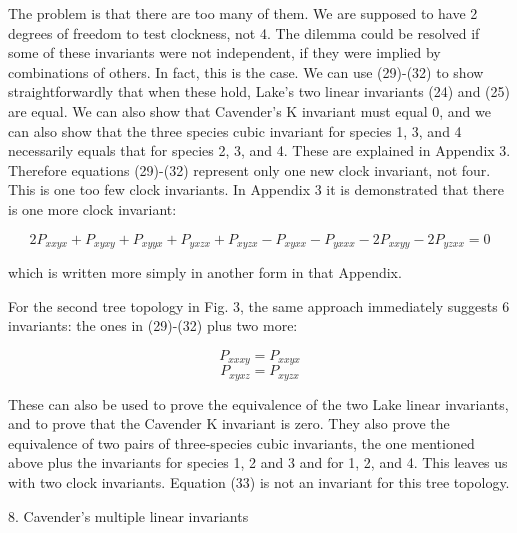 The problem is that there are too many of them.  We are supposed to have
2 degrees of freedom to test clockness, not 4.  The dilemma could be resolved
if some of these invariants were not independent, if they were implied by
combinations of others.  In fact, this is the case.  We can use (29)-(32)
to show straightforwardly that when these hold, Lake's two linear invariants
(24) and (25) are equal.  We can also show that Cavender's K invariant must
equal 0, and we can also show that the three species cubic invariant for
species 1, 3, and 4 necessarily equals that for species 2, 3, and 4.  These
are explained in Appendix 3.  Therefore
equations (29)-(32) represent only one new clock invariant, not four.  This is
one too few clock invariants.  In Appendix 3 it is demonstrated that there is
one more clock invariant:

\begin{equation} %
2 P_{xxyx} + P_{xyxy} + P_{xyyx} + P_{yxzx} + P_{xyzx} - P_{xyxx} - P_{yxxx}
- 2 P_{xxyy} - 2 P_{yzxx} = 0
\end{equation}

which is written more simply in another form in that Appendix.

For the second tree topology
in Fig. 3, the same approach immediately suggests 6 invariants: the ones
in (29)-(32) plus two more:

\medskip

\begin{equation}
P_{xxxy} = P_{xxyx}
\end{equation}
\begin{equation}
P_{xyxz} = P_{xyzx}
\end{equation}

These can also be used to prove the equivalence of the two Lake linear
invariants, and to prove that the Cavender K invariant is zero.  They also
prove the equivalence of two pairs of three-species cubic invariants, the
one mentioned above plus the invariants for species 1, 2 and 3 and for 1, 2,
and 4.  This leaves us with two clock invariants.  Equation (33) is not an
invariant for this tree topology.

\bigskip

\centerline{8. Cavender's multiple linear invariants}

\medskip


